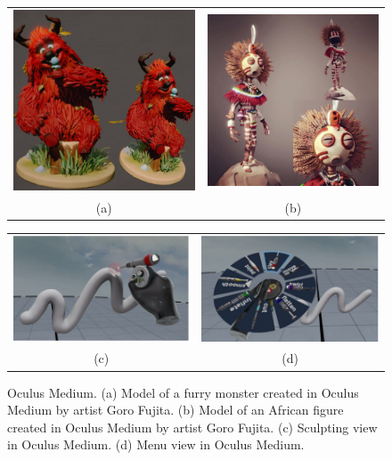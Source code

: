 \begin{figure}[!h]
    \centering
    \setlength{\tabcolsep}{0.0130\linewidth}
    \begin{tabular}{@{}cc@{}}
    \includegraphics[width=0.35\linewidth]{figures/medium_goro_fujita} &
    \includegraphics[width=0.35\linewidth]{figures/medium_goro_fujita2}\\

    (a)&(b)\\
    \end{tabular}
    
    \centering
    \setlength{\tabcolsep}{0.0130\linewidth}
    \begin{tabular}{@{}cc@{}}
   	\includegraphics[width=0.35\linewidth]{figures/medium_interface1}&
   	\includegraphics[width=0.35\linewidth]{figures/medium_interface2}\\
    (c)&(d)\\
    \end{tabular}
    \caption[Oculus Medium]{Oculus Medium.
    	  \textup{(a)} Model of a furry monster created in Oculus Medium by artist Goro Fujita.
			  \textup{(b)} Model of an African figure created in Oculus Medium by artist Goro Fujita. \textup{(c)} Sculpting view in Oculus Medium. \textup{(d)} Menu view in Oculus Medium.
      \label{fig:medium}}
\end{figure}

